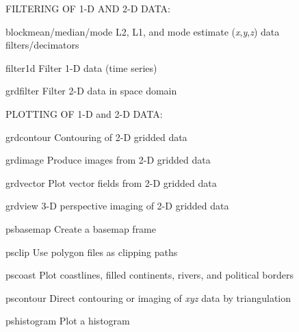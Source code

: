 \documentclass{article}
\begin{document}
\par FILTERING OF 1-D AND 2-D DATA:\par 

\par 	blockmean/median/mode	L2, L1, and mode estimate ({\it x},{\it y},{\it z}) data filters/decimators\par 

\par 	filter1d	Filter 1-D data (time series)\par 

\par 	grdfilter	Filter 2-D data in space domain\par 

\par \par 

\par PLOTTING OF 1-D and 2-D DATA:\par 

\par 	grdcontour	Contouring of 2-D gridded data \par 

\par 	grdimage	Produce images from 2-D gridded data \par 

\par 	grdvector	Plot vector fields from 2-D gridded data\par 

\par 	grdview	3-D perspective imaging of 2-D gridded data \par 

\par 	psbasemap	Create a basemap frame\par 

\par 	psclip	Use polygon files as clipping paths\par 

\par 	pscoast	Plot coastlines, filled continents, rivers, and political borders\par 

\par 	pscontour	Direct contouring or imaging of {\it xyz} data by triangulation \par 

\par 	pshistogram	Plot a histogram\par 
\end{document}
